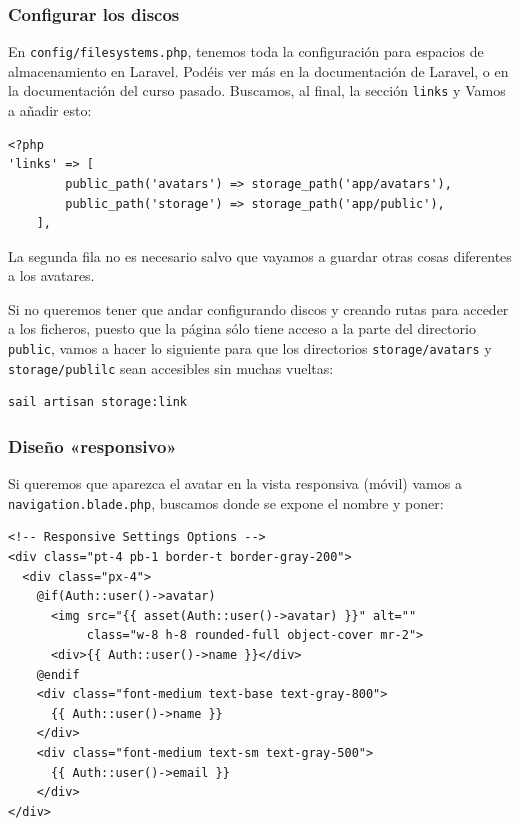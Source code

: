 \documentclass[11pt]{article}
\begin{document}
\subsubsection{Configurar los discos}
\label{sec:orgde07c67}
En \texttt{config/filesystems.php}, tenemos toda la configuración para
espacios de almacenamiento en Laravel. Podéis ver más en la
documentación de Laravel, o en la documentación del curso pasado.
Buscamos, al final, la sección \texttt{links} y Vamos a añadir esto:
\begin{verbatim}
<?php
'links' => [
        public_path('avatars') => storage_path('app/avatars'),
        public_path('storage') => storage_path('app/public'),
    ],
\end{verbatim}
La segunda fila no es necesario salvo que vayamos a guardar otras
cosas diferentes a los avatares.

Si no queremos tener que andar configurando discos y creando rutas
para acceder a los ficheros, puesto que la página sólo tiene acceso a
la parte del directorio \texttt{public}, vamos a hacer lo siguiente para que
los directorios \texttt{storage/avatars} y \texttt{storage/publilc} sean accesibles
sin muchas vueltas:
\begin{verbatim}
sail artisan storage:link
\end{verbatim}

\subsubsection{Diseño «responsivo»}
\label{sec:org07d7cb1}
Si queremos que aparezca el avatar en la vista responsiva (móvil)
vamos a \texttt{navigation.blade.php}, buscamos donde se expone el nombre y
poner:
\begin{verbatim}
<!-- Responsive Settings Options -->
<div class="pt-4 pb-1 border-t border-gray-200">
  <div class="px-4">
    @if(Auth::user()->avatar)
      <img src="{{ asset(Auth::user()->avatar) }}" alt=""
           class="w-8 h-8 rounded-full object-cover mr-2">
      <div>{{ Auth::user()->name }}</div>
    @endif
    <div class="font-medium text-base text-gray-800">
      {{ Auth::user()->name }}
    </div>
    <div class="font-medium text-sm text-gray-500">
      {{ Auth::user()->email }}
    </div>
</div>
\end{verbatim}
\end{document}
